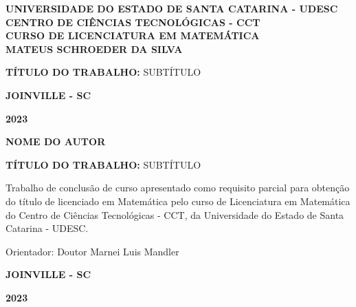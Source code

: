 \documentclass[
	12pt,				%
	oneside,			%
	a4paper,			%
	english,			%
	french,				%
	spanish,			%
	brazil,				%
	]{abntex2}
\date{2023}
\theoremstyle{plain}
\theoremstyle{definition}
\begin{document}
\frenchspacing 


\pretextual

\begin{center}
\thispagestyle{empty}%
 \textbf{ UNIVERSIDADE DO ESTADO DE SANTA CATARINA - UDESC\\
CENTRO DE CIÊNCIAS TECNOLÓGICAS - CCT\\
CURSO DE LICENCIATURA EM MATEMÁTICA\\}
\vspace{4 cm}\textbf{MATEUS SCHROEDER DA SILVA}

\vspace{4 cm}\textbf{TÍTULO DO TRABALHO:} SUBTÍTULO

\textbf{JOINVILLE - SC}

\textbf{2023}
 \pagebreak
\end{center}



\begin{folhaderosto}

  \begin{center}
    \textbf{NOME DO AUTOR}

    \vspace*{\fill}\vspace*{\fill}
    \textbf{TÍTULO DO TRABALHO:} SUBTÍTULO
    \vspace*{\fill}
  \end{center}
  
  \begin{flushright}
  \begin{minipage}[t]{8 cm}
  { Trabalho de conclusão de curso apresentado como requisito parcial para obtenção do título de licenciado em Matemática pelo curso de Licenciatura em Matemática do Centro de Ciências Tecnológicas - CCT, da Universidade do Estado de Santa Catarina - UDESC. 

 Orientador: Doutor Marnei Luis Mandler}
  \end{minipage}
  \end{flushright}
  
  
  \begin{center}
 \textbf{JOINVILLE - SC}
 
 \textbf{2023} 
  \end{center}
\end{folhaderosto}
\end{document}
